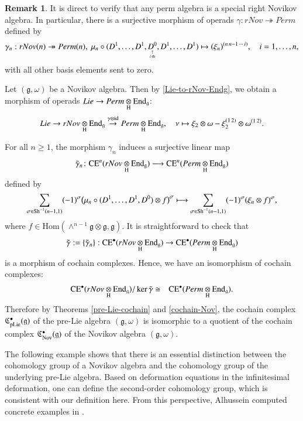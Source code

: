 \documentclass[12pt]{amsart}
\theoremstyle{definition}
\newtheorem{rmk}[thm]{Remark}
\newcommand{\g}{\mathfrak g}
\newcommand{\frkC}{\mathfrak C}
\newcommand{\id}{\mathrm{id}}
\newcommand{\Hom}{\mathrm{Hom}}
\newcommand{\End}{\mathrm{End}}
\newcommand{\ot}{\otimes}
\newcommand{\ceo}{{\rm CE}^{\bullet}}
\newcommand{\Sh}{{\rm Sh}}
\newcommand{\ce}{{\rm CE}}
\newcommand{\nov}{{\rm Nov}}
\newcommand{\pl}{{\rm pLie}}
\begin{document}
\begin{rmk}
 It is direct to verify that any perm algebra is a special right Novikov algebra. In particular, there is a surjective morphism of operads $\gamma:rNov\twoheadrightarrow Perm$ defined by
$$
\gamma_n:rNov(n)\twoheadrightarrow Perm(n),\;\mu_n\circ(D^1,\dots,D^1,\underset{\uparrow\atop i\text{-th}}{D^0},D^1,\dots,D^1) \mapsto (\xi_n)^{(n\,n-1\,\cdots\,i)},\quad i=1,\dots,n,
$$
with all other basis elements sent to zero.

Let $(\g,\omega)$ be a Novikov algebra. Then by \eqref{Lie-to-rNov-Endg}, we obtain a morphism of operads $Lie\to  Perm\underset{{\rm H}}{\ot}\End_\g$:
\begin{align*}
	Lie\to rNov\underset{{\rm H}}{\ot}\End_\g \overset{{\rm \gamma\ot\id}}{\to} Perm\underset{{\rm H}}{\ot}\End_\g,\quad \nu\mapsto \xi_2\ot \omega-\xi_2^{(1\,2)}\ot \omega^{(1\,2)}.
\end{align*}


For all $n\geq 1$, the morphism $\gamma_n$ induces a surjective linear map
	\[
	\tilde{\gamma}_n\colon \ce^n(rNov\underset{\rm H}{\ot}\End_\g) \longrightarrow \ce^n(Perm\underset{\rm H}{\ot}\End_\g)
	\]
	defined  by
	\[
	\sum_{\sigma\in\Sh^{-1}(n-1,1)}(-1)^\sigma\bigl(\mu_n\circ(D^1,\dots,D^1,D^0)\ot f\bigr)^{\sigma}
	\longmapsto
	\sum_{\sigma\in\Sh^{-1}(n-1,1)}(-1)^\sigma (\xi_n\ot f)^\sigma,
	\]
where $f\in \Hom(\wedge^{n-1}\g\ot\g,\g)$. It is straightforward to check that
$$\tilde{\gamma}:=\{\tilde{\gamma}_n\}:\ceo(rNov\underset{\rm H}{\ot}\End_\g)\to \ceo(Perm\underset{\rm H}{\ot}\End_\g)
$$
is a morphism of cochain complexes. Hence, we have an isomorphism of cochain complexes:
	\begin{eqnarray*}
		\ceo(rNov\underset{\rm H}{\ot}\End_\g)/\ker\tilde{\gamma} &\cong& \ceo(Perm\underset{\rm H}{\ot}\End_\g).
	\end{eqnarray*}
Therefore by Theorems \ref{pre-Lie-cochain} and \ref{cochain-Nov}, the cochain complex $\frkC_{\pl}^\bullet(\g)$ of the pre-Lie algebra $(\g,\omega)$ is isomorphic to a quotient of the cochain complex  $\frkC_{\nov}^\bullet(\g)$ of the Novikov algebra $(\g,\omega)$.
 \end{rmk}

 The following example shows that there is an essential distinction between the cohomology group of a Novikov algebra and the cohomology group of the underlying pre-Lie algebra.
Based on deformation equations in the infinitesimal deformation, one can define the second-order cohomology group, which is consistent with our definition here. From this perspective, Alhussein computed concrete examples in \cite{Alussein}.
\end{document}
